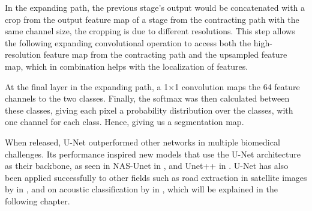     In the expanding path, the previous stage's output would be concatenated with a crop from the output feature map of a stage from the contracting path with the same channel size, the cropping is due to different resolutions. This step allows the following expanding convolutional operation to access both the high-resolution feature map from the contracting path and the upsampled feature map, which in combination helps with the localization of features\cite{unet_ronneberger2015}. 

    At the final layer in the expanding path, a 1×1 convolution maps the 64 feature channels to the two classes. Finally, the softmax was then calculated between these classes, giving each pixel a probability distribution over the classes, with one channel for each class. Hence, giving us a segmentation map\cite{unet_ronneberger2015}.
    
    
    
    When released, U-Net outperformed other networks in multiple biomedical challenges\cite{unet_ronneberger2015}. Its performance inspired new models that use the U-Net architecture as their backbone, as seen in NAS-Unet\cite{weng2019unet} in \citeyear{weng2019unet}, and Unet++\cite{zhou2018unet} in \citeyear{zhou2018unet}. U-Net has also been applied successfully  to other fields such as road extraction in satellite images by \citeauthor{zhang2018road}\cite{zhang2018road} in \citeyear{zhang2018road}, and on acoustic classification by \citeauthor{brautaset2020acoustic}\cite{brautaset2020acoustic} in \citeyear{brautaset2020acoustic}, which will be explained in the following chapter.
    
    





